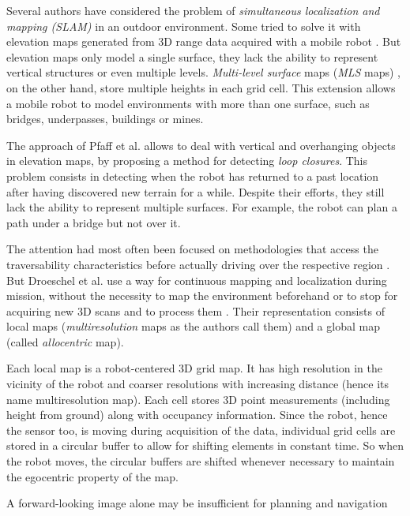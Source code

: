 \documentclass[12pt,a4paper]{report}
\newcommand{\etal}[1]{#1 et al.}
\newcommand{\term}{\textit}
\newcommand{\acronym}{\MakeUppercase}
\begin{document}
	Several authors have considered the problem of \term{simultaneous localization 
	and mapping (\acronym{slam})} in an outdoor environment. Some tried to solve it 
	with elevation maps generated from \acronym{3d} range data acquired with a 
	mobile robot \cite{Pfaff}. But elevation maps only model a single surface, 
	they lack the ability to represent vertical structures or even multiple levels.
	\term{Multi-level surface} maps (\term{\acronym{mls}} maps) \cite{Triebel}, on the other hand, store 
	multiple heights in each grid cell. This extension allows a mobile robot to model 
	environments with more than one surface, such as bridges, underpasses, buildings 
	or mines. 
	\par
	The approach of \etal{Pfaff} \cite{Pfaff} allows to deal with vertical and overhanging objects 
	in elevation maps, by proposing a method for detecting \term{loop closures}. 
	This problem consists in detecting when the robot has returned to a past location 
	after having discovered new terrain for a while. Despite their efforts, 
	they still lack the ability to represent multiple surfaces. For example, 
	the robot can plan a path under a bridge but not over it.
	\par
	The attention had most often been focused on methodologies that access the 
	traversability characteristics before actually driving over the respective 
	region \cite{Papadakis}. But \etal{Droeschel} use a way for continuous mapping 
	and localization during mission, without the necessity to map the environment 
	beforehand or to stop for acquiring new \acronym{3d} scans and to process them 
	\cite{Droeschel}. Their representation consists of local maps (\term{multiresolution} 
	maps as the authors call them) and a global map (called \term{allocentric} map).
	\par
	Each local map is a robot-centered \acronym{3d} grid map. It has high resolution 
	in the vicinity of the robot and coarser resolutions with increasing distance 
	(hence its name multiresolution map). Each cell stores \acronym{3d} point 
	measurements (including height from ground) along with occupancy information. 
	Since the robot, hence the sensor too, is moving during acquisition of the data, 
	individual grid cells are stored in a circular buffer to allow for shifting 
	elements in constant time. So when the robot moves, the circular buffers are 
	shifted whenever necessary to maintain the egocentric property of the map.
	\par
	A forward-looking image alone may be insufficient for planning and navigation 
\end{document}
